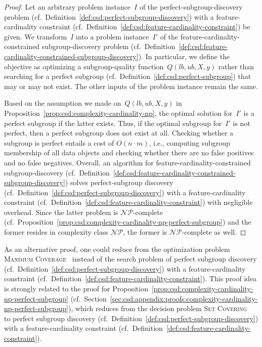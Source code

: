 \documentclass{article}
\theoremstyle{definition}
\begin{document}
\begin{proof}
Let an arbitrary problem instance~$I$ of the perfect-subgroup-discovery problem (cf.~Definition~\ref{def:csd:perfect-subgroup-discovery}) with a feature-cardinality constraint (cf.~Definition~\ref{def:csd:feature-cardinality-constraint}) be given.
We transform~$I$ into a problem instance~$I'$ of the feature-cardinality-constrained subgroup-discovery problem (cf.~Definition~\ref{def:csd:feature-cardinality-constrained-subgroup-discovery}).
In particular, we define the objective as optimizing a subgroup-quality function~$Q(\mathit{lb}, \mathit{ub}, X, y)$ rather than searching for a perfect subgroup (cf.~Definition~\ref{def:csd:perfect-subgroup}) that may or may not exist.
The other inputs of the problem instance remain the same.

Based on the assumption we made on~$Q(\mathit{lb}, \mathit{ub}, X, y)$ in Proposition~\ref{prop:csd:complexity-cardinality-np}, the optimal solution for~$I'$ is a perfect subgroup if the latter exists.
Thus, if the optimal subgroup for~$I'$ is not perfect, then a perfect subgroup does not exist at all.
Checking whether a subgroup is perfect entails a cost of $O(n \cdot m)$, i.e., computing subgroup membership of all data objects and checking whether there are no false positives and no false negatives.
Overall, an algorithm for feature-cardinality-constrained subgroup-discovery (cf.~Definition~\ref{def:csd:feature-cardinality-constrained-subgroup-discovery}) solves perfect-subgroup discovery (cf.~Definition~\ref{def:csd:perfect-subgroup-discovery}) with a feature-cardinality constraint (cf.~Definition~\ref{def:csd:feature-cardinality-constraint}) with negligible overhead.
Since the latter problem is $\mathcal{NP}$-complete (cf.~Proposition~\ref{prop:csd:complexity-cardinality-np-perfect-subgroup}) and the former resides in complexity class $\mathcal{NP}$, the former is $\mathcal{NP}$-complete as well.
\end{proof}
%
As an alternative proof, one could reduce from the optimization problem \textsc{Maximum Coverage}~\cite{chekuri2004maximum} instead of the search problem of perfect subgroup discovery (cf.~Definition~\ref{def:csd:perfect-subgroup-discovery}) with a feature-cardinality constraint (cf.~Definition~\ref{def:csd:feature-cardinality-constraint}).
This proof idea is strongly related to the proof for Proposition~\ref{prop:csd:complexity-cardinality-np-perfect-subgroup} (cf.~Section~\ref{sec:csd:appendix:proofs:complexity-cardinality-np-perfect-subgroup}), which reduces from the decision problem \textsc{Set Covering}~\cite{karp1972reducibility} to perfect subgroup discovery (cf.~Definition~\ref{def:csd:perfect-subgroup-discovery}) with a feature-cardinality constraint (cf.~Definition~\ref{def:csd:feature-cardinality-constraint}).
\end{document}
